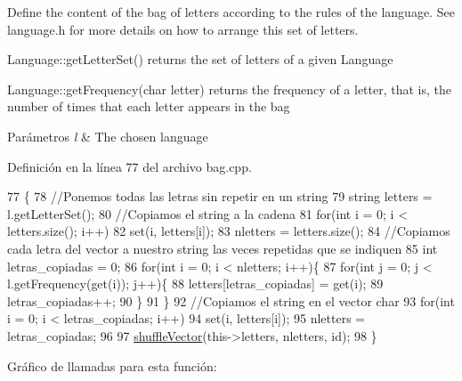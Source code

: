 Define the content of the bag of letters according to the rules of the language. See language.\+h for more details on how to arrange this set of letters. 


\begin{DoxyItemize}
\item Language\+::get\+Letter\+Set() returns the set of letters of a given Language
\item Language\+::get\+Frequency(char letter) returns the frequency of a letter, that is, the number of times that each letter appears in the bag 
\begin{DoxyParams}{Parámetros}
{\em l} & The chosen language \\
\hline
\end{DoxyParams}

\end{DoxyItemize}

Definición en la línea 77 del archivo bag.\+cpp.


\begin{DoxyCode}
77                                   \{
78     \textcolor{comment}{//Ponemos todas las letras sin repetir en un string}
79     \textcolor{keywordtype}{string} letters = l.getLetterSet();
80     \textcolor{comment}{//Copiamos el string a la cadena}
81     \textcolor{keywordflow}{for}(\textcolor{keywordtype}{int} i = 0; i < letters.size(); i++)
82         \textcolor{keyword}{set}(i, letters[i]);
83     nletters = letters.size();
84     \textcolor{comment}{//Copiamos cada letra del vector a nuestro string las veces repetidas que se indiquen}
85     \textcolor{keywordtype}{int} letras\_copiadas = 0;
86     \textcolor{keywordflow}{for}(\textcolor{keywordtype}{int} i = 0; i < nletters; i++)\{
87         \textcolor{keywordflow}{for}(\textcolor{keywordtype}{int} j = 0; j < l.getFrequency(\textcolor{keyword}{get}(i)); j++)\{
88             letters[letras\_copiadas] = \textcolor{keyword}{get}(i);
89             letras\_copiadas++;
90         \}
91     \}
92     \textcolor{comment}{//Copiamos el string en el vector char}
93     \textcolor{keywordflow}{for}(\textcolor{keywordtype}{int} i = 0; i < letras\_copiadas; i++)
94         \textcolor{keyword}{set}(i, letters[i]);
95     nletters = letras\_copiadas;
96     
97     \hyperlink{bag_8cpp_a93c24c436157bf4f753bd36d1e1d2e4a}{shuffleVector}(this->letters, nletters, \textcolor{keywordtype}{id});
98 \}
\end{DoxyCode}
Gráfico de llamadas para esta función\+:
\mbox{\label{classBag_ac75abe2b7626e50109a1add3382978af}} 
